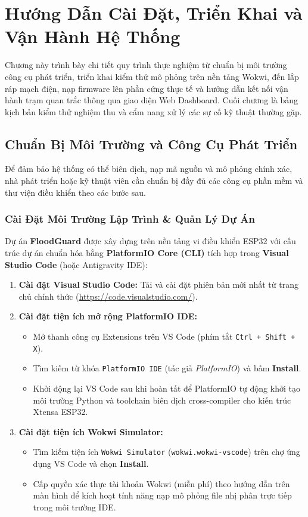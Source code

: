 \chapter{Hướng Dẫn Cài Đặt, Triển Khai và Vận Hành Hệ Thống}
\label{ch:deployment_guide}

Chương này trình bày chi tiết quy trình thực nghiệm từ chuẩn bị môi trường công cụ phát triển, triển khai kiểm thử mô phỏng trên nền tảng Wokwi, đến lắp ráp mạch điện, nạp firmware lên phần cứng thực tế và hướng dẫn kết nối vận hành trạm quan trắc thông qua giao diện Web Dashboard. Cuối chương là bảng kịch bản kiểm thử nghiệm thu và cẩm nang xử lý các sự cố kỹ thuật thường gặp.

\section{Chuẩn Bị Môi Trường và Công Cụ Phát Triển}

Để đảm bảo hệ thống có thể biên dịch, nạp mã nguồn và mô phỏng chính xác, nhà phát triển hoặc kỹ thuật viên cần chuẩn bị đầy đủ các công cụ phần mềm và thư viện điều khiển theo các bước sau.

\subsection{Cài Đặt Môi Trường Lập Trình \& Quản Lý Dự Án}
Dự án \textbf{FloodGuard} được xây dựng trên nền tảng vi điều khiển ESP32 với cấu trúc dự án chuẩn hóa bằng \textbf{PlatformIO Core (CLI)} tích hợp trong \textbf{Visual Studio Code} (hoặc Antigravity IDE):
\begin{enumerate}
    \item \textbf{Cài đặt Visual Studio Code:} Tải và cài đặt phiên bản mới nhất từ trang chủ chính thức (\url{https://code.visualstudio.com/}).
    \item \textbf{Cài đặt tiện ích mở rộng PlatformIO IDE:}
    \begin{itemize}
        \item Mở thanh công cụ Extensions trên VS Code (phím tắt \texttt{Ctrl + Shift + X}).
        \item Tìm kiếm từ khóa \texttt{PlatformIO IDE} (tác giả \textit{PlatformIO}) và bấm \textbf{Install}.
        \item Khởi động lại VS Code sau khi hoàn tất để PlatformIO tự động khởi tạo môi trường Python và toolchain biên dịch cross-compiler cho kiến trúc Xtensa ESP32.
    \end{itemize}
    \item \textbf{Cài đặt tiện ích Wokwi Simulator:}
    \begin{itemize}
        \item Tìm kiếm tiện ích \texttt{Wokwi Simulator} (\texttt{wokwi.wokwi-vscode}) trên chợ ứng dụng VS Code và chọn \textbf{Install}.
        \item Cấp quyền xác thực tài khoản Wokwi (miễn phí) theo hướng dẫn trên màn hình để kích hoạt tính năng nạp mô phỏng file nhị phân trực tiếp trong môi trường IDE.
    \end{itemize}
\end{enumerate}

